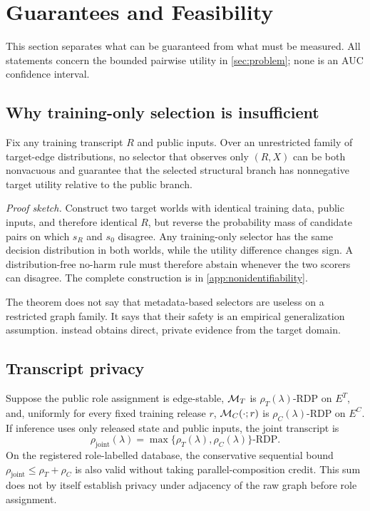 \section{Guarantees and Feasibility}
\label{sec:theory}

This section separates what can be guaranteed from what must be measured. All
statements concern the bounded pairwise utility in \cref{sec:problem}; none is
an AUC confidence interval.

\subsection{Why training-only selection is insufficient}

\begin{theorem}
\label{thm:nonidentifiability}
Fix any training transcript $R$ and public inputs. Over an unrestricted family
of target-edge distributions, no selector that observes only $(R,X)$ can be
both nonvacuous and guarantee that the selected structural branch has
nonnegative target utility relative to the public branch.
\end{theorem}

\emph{Proof sketch.}
Construct two target worlds with identical training data, public inputs, and
therefore identical $R$, but reverse the probability mass of candidate pairs
on which $s_R$ and $s_0$ disagree. Any training-only selector has the same
decision distribution in both worlds, while the utility difference changes
sign. A distribution-free no-harm rule must therefore abstain whenever the
two scorers can disagree. The complete construction is in
\cref{app:nonidentifiability}.

The theorem does not say that metadata-based selectors are useless on a
restricted graph family. It says that their safety is an empirical
generalization assumption. \method{} instead obtains direct, private evidence
from the target domain.

\subsection{Transcript privacy}

\begin{theorem}
\label{thm:privacy}
Suppose the public role assignment is edge-stable, $\mathcal{M}_T$ is
$\rho_T(\lambda)$-RDP on $E^T$, and, uniformly for every fixed training
release $r$, $\mathcal{M}_C(\cdot;r)$ is $\rho_C(\lambda)$-RDP on $E^C$. If inference
uses only released state and public inputs, the joint transcript is
\begin{equation}
 \rho_{\mathrm{joint}}(\lambda)
 =\max\{\rho_T(\lambda),\rho_C(\lambda)\}\text{-RDP}.
\end{equation}
On the registered role-labelled database, the conservative sequential bound
$\rho_{\mathrm{joint}}\leq\rho_T+\rho_C$ is also valid without taking
parallel-composition credit. This sum does not by itself establish privacy
under adjacency of the raw graph before role assignment.
\end{theorem}

